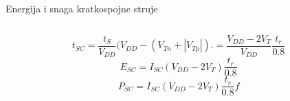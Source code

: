 \begin{frame}[label=09_2-s059]{Energija i snaga kratkospojne struje}
\begin{columns}[T,onlytextwidth]\centering {}\centering \end{columns}\[t_{SC}=\frac{t_S}{V_{DD}}\bigl(V_{DD}-(V_{Tn}+|V_{Tp}|)\bigr.=\frac{V_{DD}-2V_T}{V_{DD}}\frac{t_r}{0.8}\]
\[E_{SC}=I_{SC}(V_{DD}-2V_T)\frac{t_r}{0.8}\]
\[P_{SC}=I_{SC}(V_{DD}-2V_T)\frac{t_r}{0.8}f\]

\end{frame}
